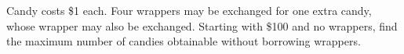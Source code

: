 Candy costs \$1 each. Four wrappers may be exchanged for one extra candy, whose wrapper may also be exchanged. Starting with \$100 and no wrappers, find the maximum number of candies obtainable without borrowing wrappers.
